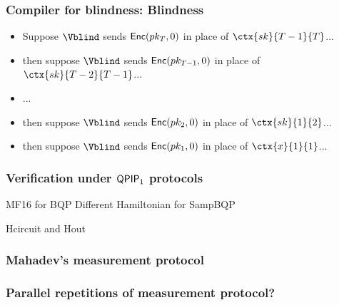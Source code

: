 \documentclass{beamer}
\begin{document}
\begin{frame}
	\frametitle{Compiler for blindness: Blindness}
	\begin{itemize}[<+->]
		\item Suppose $\Vblind$ sends $\mathsf{Enc}(pk_T, 0)$ in place of $\ctx{sk}{T-1}{T}$...
		\item then suppose $\Vblind$ sends $\mathsf{Enc}(pk_{T-1}, 0)$ in place of $\ctx{sk}{T-2}{T-1}$...
		\item ...
		\item then suppose $\Vblind$ sends $\mathsf{Enc}(pk_2, 0)$ in place of $\ctx{sk}{1}{2}$...
		\item then suppose $\Vblind$ sends $\mathsf{Enc}(pk_1, 0)$ in place of $\ctx{x}{1}{1}$...
	\end{itemize}
\end{frame}

\begin{frame}
	\frametitle{Verification under $\operatorname{\mathsf{QPIP}}_1$ protocols}
	MF16 for BQP
	Different Hamiltonian for SampBQP

	Hcircuit and Hout
\end{frame}

\begin{frame}
	\frametitle{Mahadev's measurement protocol}

\end{frame}

\begin{frame}
	\frametitle{Parallel repetitions of measurement protocol?}

\end{frame}
\end{document}

